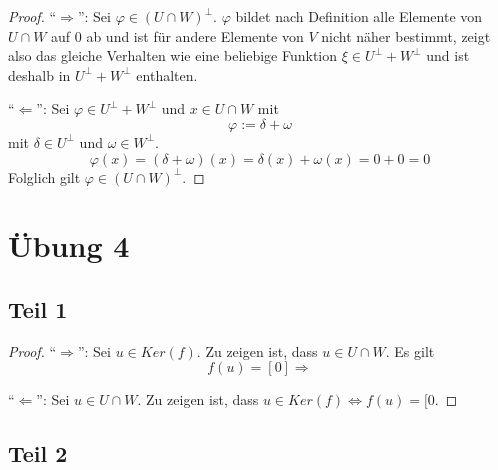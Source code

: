 \documentclass[a4paper,10pt]{article}
\begin{document}
\begin{proof}
 ``$\Rightarrow$'': Sei $\varphi \in (U \cap W)^\perp$.
 $\varphi$ bildet nach Definition alle Elemente von $U \cap W$ auf $0$ ab und ist für andere Elemente von $V$ nicht näher bestimmt, zeigt also das gleiche Verhalten wie eine beliebige Funktion $\xi \in U^\perp + W^\perp$ und ist deshalb in $U^\perp + W^\perp$ enthalten.
 
 ``$\Leftarrow$'': Sei $\varphi \in U^\perp + W^\perp$ und $x \in U \cap W$ mit
 \begin{equation}
  \varphi := \delta + \omega
 \end{equation}
 mit $\delta \in U^\perp$ und $\omega \in W^\perp$.
 \begin{equation}
  \varphi(x) = (\delta + \omega)(x) = \delta(x) + \omega(x) = 0 + 0 = 0
 \end{equation}
 Folglich gilt $\varphi \in (U \cap W)^\perp$.
\end{proof}

\section*{Übung 4}

\subsection*{Teil 1}

\begin{proof}
 ``$\Rightarrow$'': Sei $u \in Ker(f)$.
 Zu zeigen ist, dass $u \in U \cap W$.
 Es gilt
 \begin{equation}
  f(u) = [0] \Rightarrow 
 \end{equation}

 
 ``$\Leftarrow$'': Sei $u \in U \cap W$.
 Zu zeigen ist, dass $u \in Ker(f) \Leftrightarrow f(u) = [0$.
 
\end{proof}

\subsection*{Teil 2}
\end{document}
